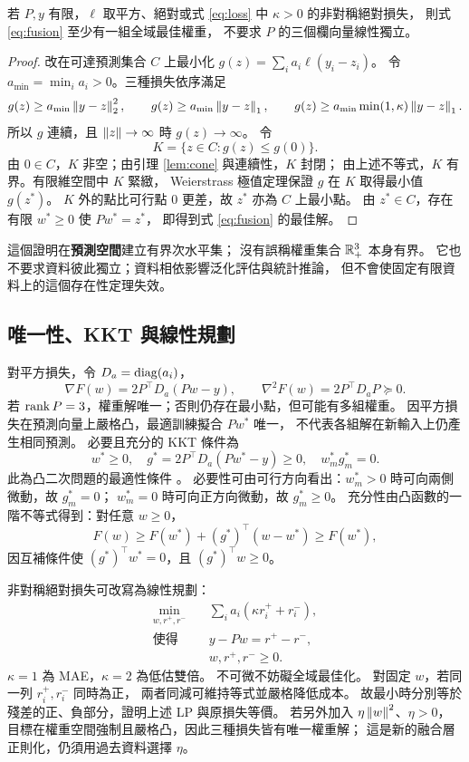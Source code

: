 \begin{theorem}[總和自由時的存在性]\label{thm:free}
若 $P,y$ 有限，$\ell$ 取平方、絕對或式 \eqref{eq:loss}
中 $\kappa>0$ 的非對稱絕對損失，
則式 \eqref{eq:fusion} 至少有一組全域最佳權重，
不要求 $P$ 的三個欄向量線性獨立。
\end{theorem}
\begin{proof}
改在可達預測集合 $C$ 上最小化
$g(z)=\sum_i a_i\ell(y_i-z_i)$。
令 $a_{\min}=\min_i a_i>0$。三種損失依序滿足
\[
g(z)\ge a_{\min}\left\lVert y-z\right\rVert_2^2,\qquad
g(z)\ge a_{\min}\left\lVert y-z\right\rVert_1,\qquad
g(z)\ge a_{\min}\min(1,\kappa)\left\lVert y-z\right\rVert_1 .
\]
所以 $g$ 連續，且 $\left\lVert z\right\rVert\to\infty$ 時 $g(z)\to\infty$。
令
\[
K=\{z\in C:g(z)\le g(0)\}.
\]
由 $0\in C$，$K$ 非空；由引理 \ref{lem:cone} 與連續性，$K$ 封閉；
由上述不等式，$K$ 有界。有限維空間中 $K$ 緊緻，
Weierstrass 極值定理保證 $g$ 在 $K$ 取得最小值 $g(z^*)$。
$K$ 外的點比可行點 0 更差，故 $z^*$ 亦為 $C$ 上最小點。
由 $z^*\in C$，存在有限 $w^*\ge0$ 使 $Pw^*=z^*$，
即得到式 \eqref{eq:fusion} 的最佳解。
\end{proof}

這個證明在\textbf{預測空間}建立有界次水平集；
沒有誤稱權重集合 $\mathbb R_+^3$ 本身有界。
它也不要求資料彼此獨立；資料相依影響泛化評估與統計推論，
但不會使固定有限資料上的這個存在性定理失效。

\subsection{唯一性、KKT 與線性規劃}
對平方損失，令 $D_a=\operatorname{diag}(a_i)$，
\[
\nabla F(w)=2P^\top D_a(Pw-y),\qquad
\nabla^2F(w)=2P^\top D_aP\succeq0 .
\]
若 $\operatorname{rank} P=3$，權重解唯一；否則仍存在最小點，但可能有多組權重。
因平方損失在預測向量上嚴格凸，最適訓練擬合 $Pw^*$ 唯一，
不代表各組解在新輸入上仍產生相同預測。
必要且充分的 KKT 條件為
\begin{equation}
w^*\ge0,\quad g^*=2P^\top D_a(Pw^*-y)\ge0,\quad
w_m^*g_m^*=0 .
\end{equation}
此為凸二次問題的最適性條件 \cite{boyd}。
必要性可由可行方向看出：$w_m^*>0$ 時可向兩側微動，故 $g_m^*=0$；
$w_m^*=0$ 時可向正方向微動，故 $g_m^*\ge0$。
充分性由凸函數的一階不等式得到：對任意 $w\ge0$，
\[
F(w)\ge F(w^*)+(g^*)^\top(w-w^*)\ge F(w^*),
\]
因互補條件使 $(g^*)^\top w^*=0$，且 $(g^*)^\top w\ge0$。

非對稱絕對損失可改寫為線性規劃：
\begin{equation}
\begin{aligned}
\min_{w,r^+,r^-}\quad&\sum_i a_i(\kappa r_i^++r_i^-),\\
\text{使得}\quad&y-Pw=r^+-r^-,\\
&w,r^+,r^-\ge0 .
\end{aligned}
\end{equation}
$\kappa=1$ 為 MAE，$\kappa=2$ 為低估雙倍。
不可微不妨礙全域最佳化。
對固定 $w$，若同一列 $r_i^+,r_i^-$ 同時為正，
兩者同減可維持等式並嚴格降低成本。
故最小時分別等於殘差的正、負部分，證明上述 LP 與原損失等價。
若另外加入 $\eta\left\lVert w\right\rVert^2$、$\eta>0$，
目標在權重空間強制且嚴格凸，因此三種損失皆有唯一權重解；
這是新的融合層正則化，仍須用過去資料選擇 $\eta$。

